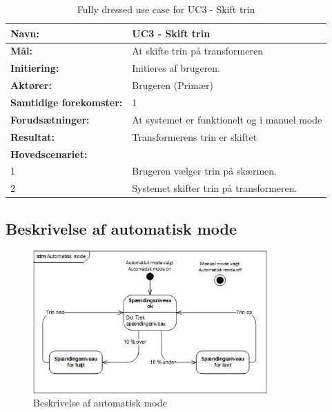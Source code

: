 \begin{table}[H]
	\centering
	
	\begin{threeparttable}
		\begin{tabularx}{\linewidth}{ l X }
			\toprule
			\bfseries{Navn:}				& UC3 - Skift trin  \\
			\midrule
			\bfseries{Mål:} 				& At skifte trin på transformeren \\
			\midrule
			\bfseries{Initiering:} 			& Initieres af brugeren. \\
			\midrule
			\bfseries{Aktører:} 			& Brugeren (Primær) \\
			\midrule
			\bfseries{Samtidige forekomster:} & 1 \\
			\midrule
			\bfseries{Forudsætninger:} 		& At systemet er funktionelt og i manuel mode\\
			\midrule
			\bfseries{Resultat:} 			& Transformerens trin er skiftet \\
			\midrule
			\bfseries{Hovedscenariet:} 	& \\
			
			
			1 	& Brugeren vælger trin på skærmen.\\
			2 	& Systemet skifter trin på transformeren.\\			
			
			\bottomrule
			
		\end{tabularx}
	\end{threeparttable}
	\caption{Fully dressed use case for UC3 - Skift trin}
	\label{table:UC3}
\end{table}


\subsection{Beskrivelse af automatisk mode}
\label{Afsnit: Automatisk mode}

\begin{figure}[htbp] %
	\centering
	\includegraphics[width=0.8\textwidth]{Figure/STM}
	\caption{Beskrivelse af automatisk mode}
	\label{fig:automode}
\end{figure}